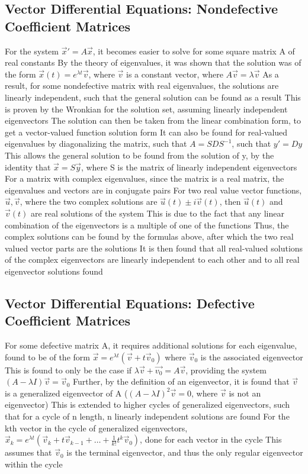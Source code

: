\documentclass[11 pt, twoside]{article}
\newenvironment{outline*}
{
	\begin{outline}[enumerate]
	}
	{\end{outline}
}
\begin{document}
\subsection{Vector Differential Equations: Nondefective Coefficient Matrices}
\begin{outline*}
\1 For the system $\vec{x}' = A\vec{x}$, it becomes easier to solve for some square matrix A of real constants
\2 By the theory of eigenvalues, it was shown that the solution was of the form $\vec{x}(t) = e^{\lambda t}\vec{v}$, where $\vec{v}$ is a constant vector, where $A\vec{v} = \lambda \vec{v}$
\2 As a result, for some nondefective matrix with real eigenvalues, the solutions are linearly independent, such that the general solution can be found as a result
\3 This is proven by the Wronkian for the solution set, assuming linearly independent eigenvectors
\2 The solution can then be taken from the linear combination form, to get a vector-valued function solution form
\1 It can also be found for real-valued eigenvalues by diagonalizing the matrix, such that $A = SDS^{-1}$, such that $y' = Dy$
\2 This allows the general solution to be found from the solution of y, by the identity that $\vec{x} = S\vec{y}$, where S is the matrix of linearly independent eigenvectors
\1 For a matrix with complex eigenvalues, since the matrix is a real matrix, the eigenvalues and vectors are in conjugate pairs
\2 For two real value vector functions, $\vec{u}, \vec{v}$, where the two complex solutions are $\vec{u}(t) \pm i\vec{v}(t)$, then $\vec{u}(t)$ and $\vec{v}(t)$ are real solutions of the system
\3 This is due to the fact that any linear combination of the eigenvectors is a multiple of one of the functions
\2 Thus, the complex solutions can be found by the formulas above, after which the two real valued vector parts are the solutions
\2 It is then found that all real-valued solutions of the complex eigenvectors are linearly independent to each other and to all real eigenvector solutions found
\end{outline*}
\subsection{Vector Differential Equations: Defective Coefficient Matrices}
\begin{outline*}
\1 For some defective matrix A, it requires additional solutions for each eigenvalue, found to be of the form $\vec{x} = e^{\lambda t}(\vec{v} + t\vec{v}_0)$ where $\vec{v}_0$ is the associated eigenvector
\2 This is found to only be the case if $\lambda \vec{v} + \vec{v_0} = A\vec{v}$, providing the system $(A - \lambda I)\vec{v} = \vec{v}_0$
\2 Further, by the definition of an eigenvector, it is found that $\vec{v}$ is a generalized eigenvector of A ($(A - \lambda I)^2\vec{v} = 0$, where $\vec{v}$ is not an eigenvector)
\1 This is extended to higher cycles of generalized eigenvectors, such that for a cycle of n length, n linearly independent solutions are found
\2 For the kth vector in the cycle of generalized eigenvectors, $\vec{x}_k = e^{\lambda t}(\vec{v}_k + t\vec{v}_{k-1} + \dots + \frac{1}{k!}t^k\vec{v}_0)$, done for each vector in the cycle
\3 This assumes that $\vec{v}_0$ is the terminal eigenvector, and thus the only regular eigenvector within the cycle
\end{outline*}
\end{document}
